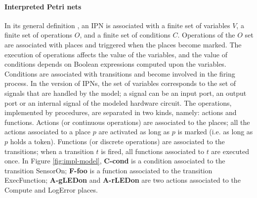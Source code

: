 \documentclass[pdflatex,sn-mathphys]{sn-jnl}%
\theoremstyle{thmstyleone}%
\theoremstyle{thmstyletwo}%
\theoremstyle{thmstylethree}%
\begin{document}
\paragraph{Interpreted Petri nets}
In its general definition \cite{David1994}, an IPN is associated with
a finite set of variables $V$, a finite set of operations $O$, and a
finite set of conditions $C$. Operations of the $O$ set are associated
with places and triggered when the places become marked. The execution
of operations affects the value of the variables, and the value of
conditions depends on Boolean expressions computed upon the variables.
Conditions are associated with transitions and become involved in the
firing process.  In the \hilecop{} version of
IPNs, %
the set of variables corresponds to the set of \vhdl{} signals that
are handled by the model; a signal can be an input port, an output
port or an internal signal of the modeled hardware circuit. The
operations, implemented by \vhdl{} procedures, are separated in two
kinds, namely: actions and functions. Actions (or continuous
operations) are associated to the places; all the actions associated
to a place $p$ are activated as long as $p$ is marked (i.e. as long as
$p$ holds a token). Functions (or discrete operations) are associated
to the transitions; when a transition $t$ is fired, all functions
associated to $t$ are executed once. In Figure \ref{fig:impl-model},
\textbf{C-cond} is a condition associated to the transition SensorOn;
\textbf{F-foo} is a function associated to the transition
ExecFunction; \textbf{A-gLEDon} and \textbf{A-rLEDon} are two actions
associated to the Compute and LogError places.
\end{document}
